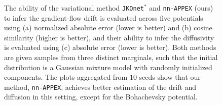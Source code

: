 \documentclass[twoside]{article}
\newcommand{\dx}{\mathrm{d}x}
\newcommand{\jkonetstar}{\texttt{JKOnet}$^\ast$}
\newcommand{\nappex}{\texttt{nn-APPEX}}
\begin{document}
\begin{figure}[t]


    \caption{The ability of the variational method \jkonetstar{} and \nappex{} (ours) to infer the gradient-flow drift is evaluated across five potentials using (a) normalized absolute error (lower is better) and (b) cosine similarity (higher is better), and their ability to infer the diffusivity is evaluated using (c) absolute error (lower is better). Both methods are given samples from three distinct marginals, such that the initial distribution is a Gaussian mixture model with randomly initialized components. The plots aggregated from $10$ seeds show that our method, \nappex{}, achieves better estimation of the drift and diffusion in this setting, except for the Bohachevsky potential.}
    \label{fig:boxplots_jko_appex}
\end{figure}
\end{document}
